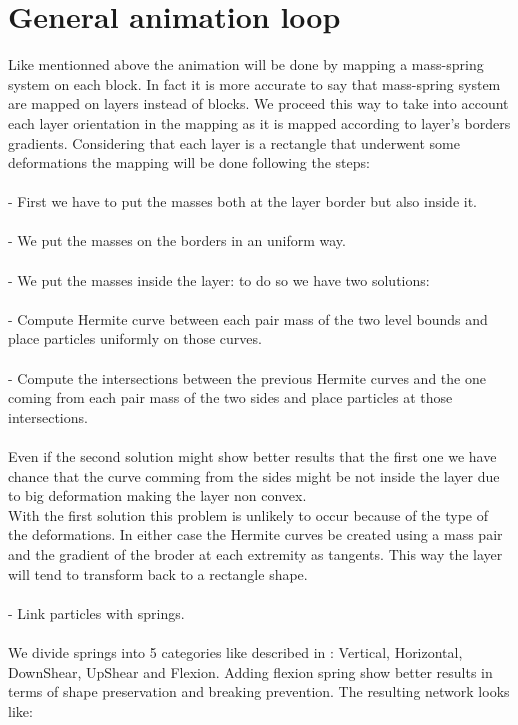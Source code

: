 \documentclass[12pt, a4paper]{report} %
\begin{document}
\section{General animation loop}
\label{sec:generalanimation}
Like mentionned above the animation will be done by mapping a mass-spring system on each block. In fact it is more accurate to say that mass-spring system are mapped on layers instead of blocks. We proceed this way to take into account each layer orientation in the mapping as it is mapped according to layer's borders gradients. Considering that each layer is a rectangle that underwent some deformations the mapping will be done following the steps:	\\\\		
\indent	- First we have to put the masses both at the layer border but also inside it.\\\\
\indent	- We put the masses on the borders in an uniform way.\\\\
\indent	- We put the masses inside the layer: to do so we have two solutions:\\\\
\indent \indent	- Compute Hermite curve between each pair mass of the two level bounds and place particles uniformly on those curves.\\\\
\indent \indent	- Compute the intersections between the previous Hermite curves and the one coming from each pair mass of the two sides and place particles at those intersections.\\\\
	Even if the second solution might show better results that the first one we have chance that the curve comming from the sides might be not inside the layer due to big deformation making the layer non convex. \\With the first solution this problem is unlikely to occur because of the type of the deformations. In either case the Hermite curves be created using a mass pair and the gradient of the broder at each extremity as tangents. This way the layer will tend to transform back to a rectangle shape.\\\\
\indent	- Link particles with springs. \\\\We divide springs into 5 categories like described in \cite{cloth}: Vertical, Horizontal, DownShear, UpShear and Flexion. Adding flexion spring show better results in terms of shape preservation and breaking prevention. The resulting network looks like:\\
	
\end{document}
